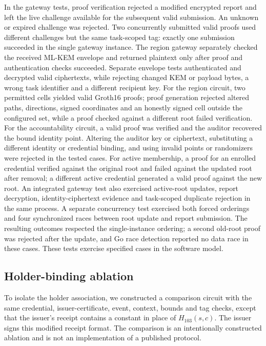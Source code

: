 \documentclass[pdflatex,iicol,sn-mathphys-num]{sn-jnl}
\begin{document}
In the gateway tests, proof verification rejected a modified encrypted report and left the live challenge available for the subsequent valid submission. An unknown or expired challenge was rejected. Two concurrently submitted valid proofs used different challenges but the same task-scoped tag: exactly one submission succeeded in the single gateway instance. The region gateway separately checked the received ML-KEM envelope and returned plaintext only after proof and authentication checks succeeded. Separate envelope tests authenticated and decrypted valid ciphertexts, while rejecting changed KEM or payload bytes, a wrong task identifier and a different recipient key. For the region circuit, two permitted cells yielded valid Groth16 proofs; proof generation rejected altered paths, directions, signed coordinates and an honestly signed cell outside the configured set, while a proof checked against a different root failed verification. For the accountability circuit, a valid proof was verified and the auditor recovered the bound identity point. Altering the auditor key or ciphertext, substituting a different identity or credential binding, and using invalid points or randomizers were rejected in the tested cases. For active membership, a proof for an enrolled credential verified against the original root and failed against the updated root after removal; a different active credential generated a valid proof against the new root. An integrated gateway test also exercised active-root updates, report decryption, identity-ciphertext evidence and task-scoped duplicate rejection in the same process. A separate concurrency test exercised both forced orderings and four synchronized races between root update and report submission. The resulting outcomes respected the single-instance ordering; a second old-root proof was rejected after the update, and Go race detection reported no data race in these cases. These tests exercise specified cases in the software model.

\subsection{Holder-binding ablation}
To isolate the holder association, we constructed a comparison circuit with the same credential, issuer-certificate, event, context, bounds and tag checks, except that the issuer's receipt contains a constant in place of $H_{103}(s,c)$. The issuer signs this modified receipt format. The comparison is an intentionally constructed ablation and is not an implementation of a published protocol.
\end{document}
